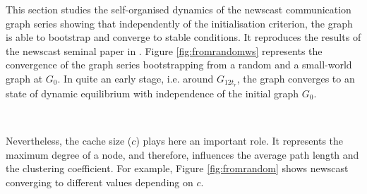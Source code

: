 This section studies the self-organised dynamics of the newscast
communication graph series showing that independently of the
initialisation criterion, the graph is able to bootstrap and converge to
stable conditions. It reproduces the results of the newscast seminal paper in  \cite{jelasity:newscast}.  Figure \ref{fig:fromrandomws} represents the
convergence of the graph series bootstrapping from a random and a
small-world graph at $G_0$. In quite an early stage, i.e. around
$G_{12t_r}$, the graph converges to an state of dynamic
equilibrium with independence of the initial graph $G_0$. 

\begin{figure*}[htbp]
\centering
{}\\
\caption{Convergence of the average path length ({\em up}) and
 clustering coefficient ({\em down}) bootstrapping from a random and a
 Watts-Strogatz (ws) graph for a number of nodes $n=1600$. The graph can be seen to converge to the same values within the interval
 $G_{0t_r-20t_r}$ showing the independence of the protocol convergence
with respect to the initialisation criterion.}
\label{fig:fromrandomws}
\end{figure*}

Nevertheless, the cache size ($c$) plays here an important role. It represents the maximum degree of a node, and therefore, influences the average path length and the clustering coefficient. For example, Figure \ref{fig:fromrandom} shows newscast converging to different values depending on $c$.

\begin{figure*}[htbp]
\centering
{}\\
\caption{Convergence of the average path length ({\em up}) and clustering coefficient ({\em down}) bootstrapping from a random graph for different cache sizes and a number of nodes $n=1600$}
\label{fig:fromrandom}
\end{figure*}


